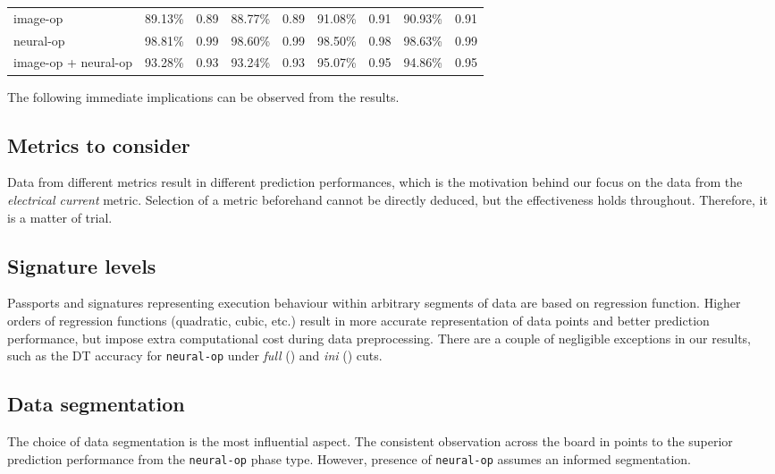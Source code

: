\begin{table*}[htbp]
\begin{subtable}{\textwidth}
\begin{tabular}{@{}lrrrrrrrr@{}}
            image-op          		& 89.13\%  & 0.89  & 88.77\%  & 0.89  & 91.08\%  & 0.91  & 90.93\%  & 0.91 \\
            neural-op         		& 98.81\%  & 0.99  & 98.60\%  & 0.99  & 98.50\%  & 0.98  & 98.63\%  & 0.99 \\
            image-op + neural-op 	& 93.28\%  & 0.93  & 93.24\%  & 0.93  & 95.07\%  & 0.95  & 94.86\%  & 0.95 \\
            \bottomrule
        \end{tabular}
    \end{subtable}
\end{table*}

The following immediate implications can be observed from the results.

\subsection{Metrics to consider}
Data from different metrics result in different prediction performances, which is the motivation behind our focus on the data from the \emph{electrical current} metric. Selection of a metric beforehand cannot be directly deduced, but the effectiveness holds throughout. Therefore, it is a matter of trial.

\subsection{Signature levels}
Passports and signatures representing execution behaviour within arbitrary segments of data are based on regression function. Higher orders of regression functions (quadratic, cubic, etc.) result in more accurate representation of data points and better prediction performance, but impose extra computational cost during data preprocessing. There are a couple of negligible exceptions in our results, such as the DT accuracy for \texttt{neural-op} under \emph{full} () and \emph{ini} () cuts.

\subsection{Data segmentation}
The choice of data segmentation is the most influential aspect. The consistent observation across the board in  points to the superior prediction performance from the \texttt{neural-op} phase type. However, presence of \texttt{neural-op} assumes an informed segmentation.

